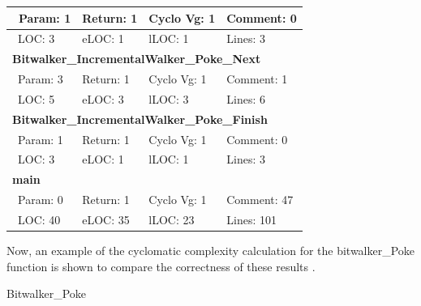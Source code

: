 \begin{longtable}{||p{}|p{}|p{}|p{}||}
\\\hline
\ Param: 1 &
Return: 1 &
Cyclo Vg: 1 &
Comment: 0
 \\\hline
\ LOC: 3 &
eLOC: 1 &
lLOC: 1 &
Lines: 3
 \\\hline
\multicolumn{4}{||l||}{\textbf{Bitwalker\_IncrementalWalker\_Poke\_Next}}
\\\hline
\ Param: 3 &
Return: 1 &
Cyclo Vg: 1 &
Comment: 1
 \\\hline
\ LOC: 5 &
eLOC: 3 &
lLOC: 3 &
Lines: 6
 \\\hline
\multicolumn{4}{||l||}{\textbf{Bitwalker\_IncrementalWalker\_Poke\_Finish}}
\\\hline
\ Param: 1 &
Return: 1 &
Cyclo Vg: 1 &
Comment: 0
 \\\hline
\ LOC: 3 &
eLOC: 1 &
lLOC: 1 &
Lines: 3
 \\\hline
\multicolumn{4}{||l||}{\textbf{main}}
\\\hline
\ Param: 0 &
Return: 1 &
Cyclo Vg: 1 &
Comment: 47
 \\\hline
\ LOC: 40 &
eLOC: 35 &
lLOC: 23 &
Lines: 101
 \\\hline
\end{longtable}


Now, an example of the cyclomatic complexity calculation for the bitwalker\_Poke function is shown to compare the correctness of these results .

\begin{listing}[hbt]
\begin{minipage}{\textwidth}

\end{minipage}
\caption{\label{fig:impl-poke} Bitwalker\_Poke}
\end{listing}

